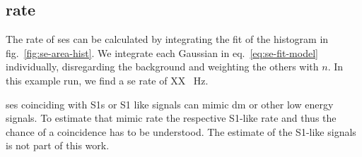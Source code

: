 
\FloatBarrier
\subsection{rate}
\label{ssec:rate}
\FloatBarrier


The rate of \glspl{se} can be calculated by integrating the fit of the histogram in fig.~\ref{fig:se-area-hist}.
We integrate each Gaussian in eq.~\ref{eq:se-fit-model} individually, disregarding the background and weighting the others with $ n $.
In this example run, we find a \gls{se} rate of XX \SI{}{\hertz}.

\glspl{se} coinciding with S1s or S1 like signals can mimic \gls{dm} or other low energy signals.
To estimate that mimic rate the respective S1-like rate and thus the chance of a coincidence has to be understood.
The estimate of the S1-like signals is not part of this work.







